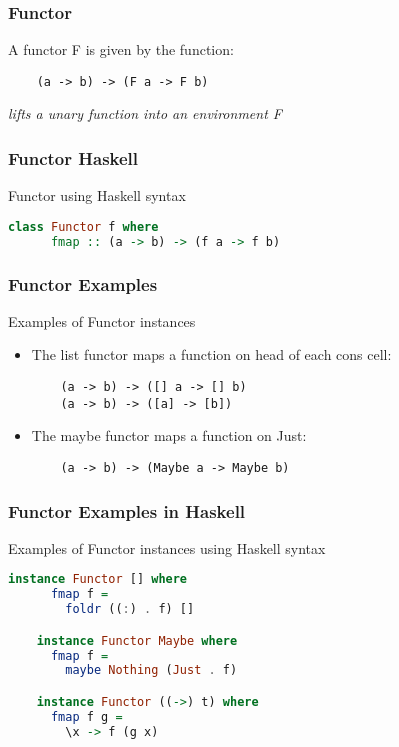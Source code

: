 \begin{frame}[fragile]
\frametitle{Functor}
\begin{block}{A functor F is given by the function:}
\begin{lstlisting}
    (a -> b) -> (F a -> F b)
\end{lstlisting}
\end{block}
\emph{lifts a unary function into an environment F}
\end{frame}

\begin{frame}[fragile]
\frametitle{Functor Haskell}
\begin{block}{Functor using Haskell syntax}
\begin{lstlisting}[language=haskell]
    class Functor f where
      fmap :: (a -> b) -> (f a -> f b)
\end{lstlisting}
\end{block}
\end{frame}

\begin{frame}[fragile]
\frametitle{Functor Examples}
\begin{block}{Examples of Functor instances}
\begin{itemize}
  \item The list functor maps a function on head of each cons cell:
    \begin{lstlisting}
    (a -> b) -> ([] a -> [] b)
    (a -> b) -> ([a] -> [b])
    \end{lstlisting}
  \item The maybe functor maps a function on Just:
    \begin{lstlisting}
    (a -> b) -> (Maybe a -> Maybe b)
    \end{lstlisting}    
\end{itemize}
\end{block}
\end{frame}

\begin{frame}[fragile]
\frametitle{Functor Examples in Haskell}
\begin{block}{Examples of Functor instances using Haskell syntax}
\begin{lstlisting}[language=haskell]
    instance Functor [] where
      fmap f =
        foldr ((:) . f) []

    instance Functor Maybe where
      fmap f =
        maybe Nothing (Just . f)

    instance Functor ((->) t) where
      fmap f g =
        \x -> f (g x)
\end{lstlisting}
\end{block}
\end{frame}
